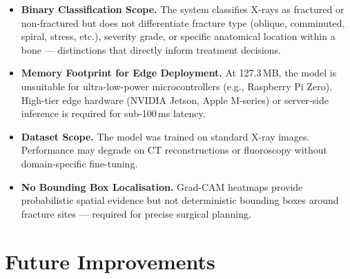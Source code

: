 \documentclass[12pt, a4paper]{article}
\begin{document}
\begin{itemize}

  \item \textbf{Binary Classification Scope.}
  The system classifies X-rays as fractured or non-fractured but does not differentiate fracture
  type (oblique, comminuted, spiral, stress, etc.), severity grade, or specific anatomical
  location within a bone — distinctions that directly inform treatment decisions.

  \item \textbf{Memory Footprint for Edge Deployment.}
  At 127.3\,MB, the model is unsuitable for ultra-low-power microcontrollers (e.g.,
  Raspberry Pi Zero). High-tier edge hardware (NVIDIA Jetson, Apple M-series) or server-side
  inference is required for sub-100\,ms latency.

  \item \textbf{Dataset Scope.}
  The model was trained on standard X-ray images. Performance may degrade on CT reconstructions
  or fluoroscopy without domain-specific fine-tuning.

  \item \textbf{No Bounding Box Localisation.}
  Grad-CAM heatmaps provide probabilistic spatial evidence but not deterministic bounding boxes
  around fracture sites — required for precise surgical planning.

\end{itemize}

\section{Future Improvements}
\end{document}
